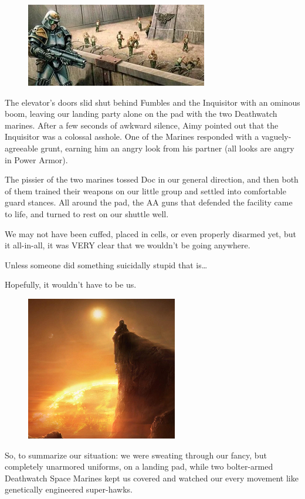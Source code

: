 \begin{figure}
	\begin{center}
		\includegraphics[width=\figwidth]{pics/16/3.png}
	\end{center}
\end{figure}
The elevator's doors slid shut behind Fumbles and the Inquisitor with an ominous boom, leaving our landing party alone on the pad with the two Deathwatch marines. 
After a few seconds of awkward silence, Aimy pointed out that the Inquisitor was a colossal asshole. 
One of the Marines responded with a vaguely-agreeable grunt, earning him an angry look from his partner (all looks are angry in Power Armor).

The pissier of the two marines tossed Doc in our general direction, and then both of them trained their weapons on our little group and settled into comfortable guard stances. 
All around the pad, the AA guns that defended the facility came to life, and turned to rest on our shuttle well.

We may not have been cuffed, placed in cells, or even properly disarmed yet, but it all-in-all, it was VERY clear that we wouldn't be going anywhere.

Unless someone did something suicidally stupid that is…

Hopefully, it wouldn't have to be us.


\begin{figure}
	\begin{center}
		\includegraphics[width=\figwidth]{pics/16/4.png}
	\end{center}
\end{figure}
So, to summarize our situation: 
we were sweating through our fancy, but completely unarmored uniforms, on a landing pad, while two bolter-armed Deathwatch Space Marines kept us covered and watched our every movement like genetically engineered super-hawks. 


